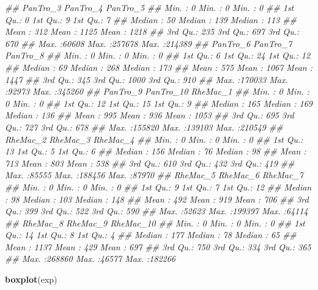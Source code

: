 \documentclass[]{book}
\newenvironment{Shaded}{\begin{snugshade}}{\end{snugshade}}
\newcommand{\CommentTok}[1]{\textcolor[rgb]{0.56,0.35,0.01}{\textit{#1}}}
\newcommand{\KeywordTok}[1]{\textcolor[rgb]{0.13,0.29,0.53}{\textbf{#1}}}
\newcommand{\NormalTok}[1]{#1}
\begin{document}
\begin{Shaded}
\begin{Highlighting}[]
\CommentTok{##     PanTro_3        PanTro_4         PanTro_5     }
\CommentTok{##  Min.   :    0   Min.   :     0   Min.   :     0  }
\CommentTok{##  1st Qu.:    0   1st Qu.:     9   1st Qu.:     7  }
\CommentTok{##  Median :   50   Median :   139   Median :   113  }
\CommentTok{##  Mean   :  312   Mean   :  1125   Mean   :  1218  }
\CommentTok{##  3rd Qu.:  235   3rd Qu.:   697   3rd Qu.:   670  }
\CommentTok{##  Max.   :60608   Max.   :257678   Max.   :214389  }
\CommentTok{##     PanTro_6         PanTro_7        PanTro_8     }
\CommentTok{##  Min.   :     0   Min.   :    0   Min.   :     0  }
\CommentTok{##  1st Qu.:     6   1st Qu.:   24   1st Qu.:    12  }
\CommentTok{##  Median :    69   Median :  268   Median :   173  }
\CommentTok{##  Mean   :   575   Mean   : 1067   Mean   :  1447  }
\CommentTok{##  3rd Qu.:   345   3rd Qu.: 1000   3rd Qu.:   910  }
\CommentTok{##  Max.   :170033   Max.   :92973   Max.   :345260  }
\CommentTok{##     PanTro_9        PanTro_10         RheMac_1     }
\CommentTok{##  Min.   :     0   Min.   :     0   Min.   :     0  }
\CommentTok{##  1st Qu.:    12   1st Qu.:    15   1st Qu.:     9  }
\CommentTok{##  Median :   165   Median :   169   Median :   136  }
\CommentTok{##  Mean   :   995   Mean   :   936   Mean   :  1053  }
\CommentTok{##  3rd Qu.:   695   3rd Qu.:   727   3rd Qu.:   678  }
\CommentTok{##  Max.   :155820   Max.   :139103   Max.   :210549  }
\CommentTok{##     RheMac_2        RheMac_3         RheMac_4    }
\CommentTok{##  Min.   :    0   Min.   :     0   Min.   :    0  }
\CommentTok{##  1st Qu.:   13   1st Qu.:     5   1st Qu.:    6  }
\CommentTok{##  Median :  156   Median :    76   Median :   98  }
\CommentTok{##  Mean   :  713   Mean   :   803   Mean   :  538  }
\CommentTok{##  3rd Qu.:  610   3rd Qu.:   432   3rd Qu.:  419  }
\CommentTok{##  Max.   :85555   Max.   :188456   Max.   :87970  }
\CommentTok{##     RheMac_5        RheMac_6         RheMac_7    }
\CommentTok{##  Min.   :    0   Min.   :     0   Min.   :    0  }
\CommentTok{##  1st Qu.:    9   1st Qu.:     7   1st Qu.:   12  }
\CommentTok{##  Median :   98   Median :   103   Median :  148  }
\CommentTok{##  Mean   :  492   Mean   :   919   Mean   :  706  }
\CommentTok{##  3rd Qu.:  399   3rd Qu.:   522   3rd Qu.:  590  }
\CommentTok{##  Max.   :52623   Max.   :199397   Max.   :64114  }
\CommentTok{##     RheMac_8         RheMac_9       RheMac_10     }
\CommentTok{##  Min.   :     0   Min.   :    0   Min.   :     0  }
\CommentTok{##  1st Qu.:    14   1st Qu.:    8   1st Qu.:     4  }
\CommentTok{##  Median :   177   Median :   78   Median :    65  }
\CommentTok{##  Mean   :  1137   Mean   :  429   Mean   :   697  }
\CommentTok{##  3rd Qu.:   750   3rd Qu.:  334   3rd Qu.:   365  }
\CommentTok{##  Max.   :268860   Max.   :46577   Max.   :182266}

\KeywordTok{boxplot}\NormalTok{(exp)}
\end{Highlighting}
\end{Shaded}
\end{document}
